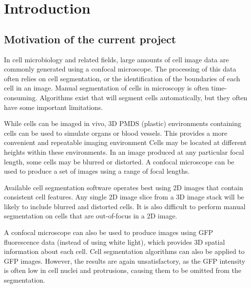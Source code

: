 
\chapter{Introduction}  %

\ifpdf
    \graphicspath{{Chapter1/Figs/Raster/}{Chapter1/Figs/PDF/}{Chapter1/Figs/}}
\else
    \graphicspath{{Chapter1/Figs/Vector/}{Chapter1/Figs/}}
\fi

\section{Motivation of the current project} %
\label{section1.1}

In cell microbiology and related fields, large amounts of cell image data are commonly generated using a confocal microscope. The processing of this data often relies on cell segmentation, or the identification of the boundaries of each cell in an image. Manual segmentation of cells in microscopy is often time-consuming. Algorithms exist that will segment cells automatically, but they often have some important limitations.

While cells can be imaged in vivo, 3D PMDS (plastic) environments containing cells can be used to simulate organs or blood vessels. This provides a more convenient and repeatable imaging environment Cells may be located at different heights within these environments. In an image produced at any particular focal length, some cells may be blurred or distorted. A confocal microscope can be used to produce a set of images using a range of focal lengths.

Available cell segmentation software operates best using 2D images that contain consistent cell features. Any single 2D image slice from a 3D image stack will be likely to include blurred and distorted cells. It is also difficult to perform manual segmentation on cells that are out-of-focus in a 2D image.

A confocal microscope can also be used to produce images using GFP fluorescence data (instead of using white light), which provides 3D spatial information about each cell. Cell segmentation algorithms can also be applied to GFP images. However, the results are again unsatisfactory, as the GFP intensity is often low in cell nuclei and protrusions, causing them to be omitted from the segmentation. 

